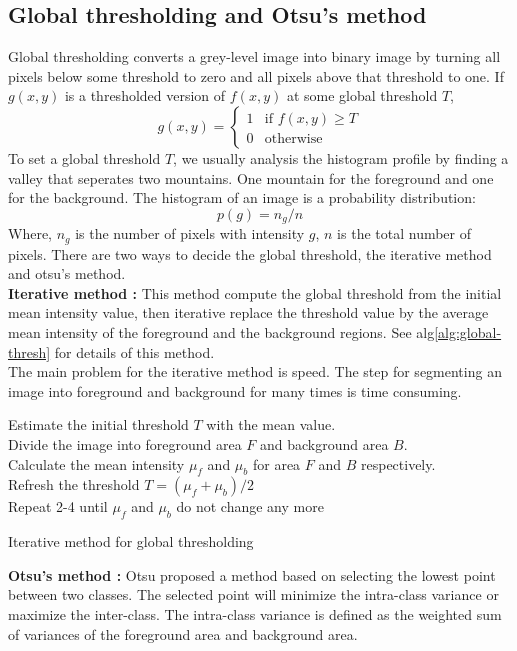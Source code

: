 \subsection{Global thresholding and Otsu's method}
Global thresholding converts a grey-level image into binary image by turning all pixels below some threshold to zero and all pixels above that threshold to one. If $g(x,y)$ is a thresholded version of $f(x,y)$ at some global threshold $T$, 
$$
g(x,y) = \left\{
  \begin{array}{ll}
  1 & \mbox{if } f(x,y) \ge T \\
  0 & \mbox{otherwise}
  \end{array}
  \right.
$$
To set a global threshold $T$, we usually analysis the histogram profile by finding a valley that seperates two mountains. One mountain for the foreground and one for the background. The histogram of an image is a probability distribution:
$$
p(g) = n_g/n
$$
Where, $n_g$ is the number of pixels with intensity $g$, $n$ is the total number of pixels. There are two ways to decide the global threshold, the iterative method and otsu's method. \\
\textbf{Iterative method :} This method compute the global threshold from the initial mean intensity value, then iterative replace the threshold value by the average mean intensity of the foreground and the background regions. See alg\ref{alg:global-thresh} for details of this method.\\
The main problem for the iterative method is speed. The step for segmenting an image into foreground and background for many times is time consuming.\\
\begin{algorithm}
\SetAlgoLined
{}
Estimate the initial threshold $T$ with the mean value.\\
Divide the image into foreground area $F$ and background area $B$.\\
Calculate the mean intensity $\mu_f$ and $\mu_b$ for area $F$ and $B$ respectively.\\
Refresh the threshold $T = (\mu_f + \mu_b)/2$\\
Repeat 2-4 until $\mu_f$ and $\mu_b$ do not change any more
\caption{Iterative method for global thresholding}
\label{alg:global-thresh}
\end{algorithm}
\textbf{Otsu's method : } Otsu \cite{otsu1975threshold} proposed a method based on selecting the lowest point between two classes. The selected point will minimize the intra-class variance or maximize the inter-class. The intra-class variance is defined as the weighted sum of variances of the foreground area and background area.
